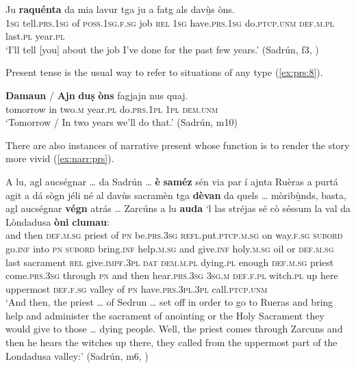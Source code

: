 \ea\label{ex:prs:7}
\gll   Ju \textbf{raquénta} da mia lavur tga ju a fatg als davù̱s òns. \\
\textsc{1sg} tell.\textsc{prs.1sg} of \textsc{poss.1sg.f.sg} job \textsc{rel} \textsc{1sg}  have.\textsc{prs.1sg} do.\textsc{ptcp.unm} \textsc{def.m.pl} last.\textsc{pl} year.\textsc{pl}\\
\glt `I’ll tell [you] about the job I've done for the past few years.' (Sadrún, f3, )
\z

Present tense is the usual way to refer to  situations of any type (\ref{ex:prs:8}).

\ea\label{ex:prs:8}
\gll   \textbf{Damaun} / \textbf{Ajn} \textbf{duṣ} \textbf{òns} fagjajn nus quaj. \\
tomorrow {} in two.\textsc{m} year.\textsc{pl} do.\textsc{prs.1pl} \textsc{1pl} \textsc{dem.unm}\\
\glt `Tomorrow / In two years we'll do that.' (Sadrún, m10)
\z

There are also instances of narrative present whose function is to render the story more vivid (\ref{ex:narr:prs}).

\ea\label{ex:narr:prs}
\gll    A lu, agl aucségnar … da Sadrún … \textbf{è} \textbf{saméz} sén via par í ajnta Ruèras a purtá agit a dá sògn jéli né al davùs sacramèn tga \textbf{dèvan} da quels … mòribù̱nds, basta, agl aucségnar \textbf{végn} atrás … Zarcúns a lu \textbf{auda} `l las stréjas sé cò séssum la val da Lòndadusa \textbf{òni} \textbf{clumau}:\\
and then \textsc{def.m.sg} priest {} of \textsc{pn} {} be.\textsc{prs.3sg}  \textsc{refl.}put.\textsc{ptcp.m.sg} on way.\textsc{f.sg} \textsc{subord} go.\textsc{inf} into \textsc{pn}  \textsc{subord} bring.\textsc{inf} help.\textsc{m.sg} and give.\textsc{inf} holy.\textsc{m.sg} oil or \textsc{def.m.sg} last sacrament \textsc{rel} give.\textsc{impf.3pl} \textsc{dat} \textsc{dem.m.pl} {} dying.\textsc{pl} enough \textsc{def.m.sg} priest come.\textsc{prs.3sg} through {} \textsc{pn} and then hear.\textsc{prs.3sg} \textsc{3sg.m} \textsc{def.f.pl} witch.\textsc{pl} up here uppermost \textsc{def.f.sg} valley of \textsc{pn} have.\textsc{prs.3pl.3pl} call.\textsc{ptcp.unm}\\
\glt `And then, the priest … of Sedrun … set off in order to go to Rueras and bring help and administer the sacrament of anointing or the Holy Sacrament they would give to those … dying people. Well, the priest comes through Zarcuns and then he hears the witches up there, they called from the uppermost part of the Londadusa valley:' (Sadrún, m6, )
\z

